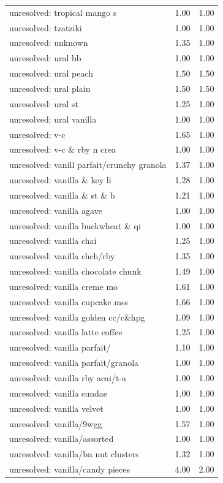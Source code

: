 \begin{table}
\begin{tabular}{lrr}
unresolved: tropical mango s & 1.00 & 1.00 \\
unresolved: tzatziki & 1.00 & 1.00 \\
unresolved: unknown & 1.35 & 1.00 \\
unresolved: ural bb & 1.00 & 1.00 \\
unresolved: ural peach & 1.50 & 1.50 \\
unresolved: ural plain & 1.50 & 1.50 \\
unresolved: ural st & 1.25 & 1.00 \\
unresolved: ural vanilla & 1.00 & 1.00 \\
unresolved: v-c & 1.65 & 1.00 \\
unresolved: v-c \& rby n crea & 1.00 & 1.00 \\
unresolved: vanill parfait/crunchy granola & 1.37 & 1.00 \\
unresolved: vanilla \& key li & 1.28 & 1.00 \\
unresolved: vanilla \& st \& b & 1.21 & 1.00 \\
unresolved: vanilla agave & 1.00 & 1.00 \\
unresolved: vanilla buckwheat \& qi & 1.00 & 1.00 \\
unresolved: vanilla chai & 1.25 & 1.00 \\
unresolved: vanilla chch/rby & 1.35 & 1.00 \\
unresolved: vanilla chocolate chunk & 1.49 & 1.00 \\
unresolved: vanilla creme mo & 1.61 & 1.00 \\
unresolved: vanilla cupcake mss & 1.66 & 1.00 \\
unresolved: vanilla golden cc/c\&hpg & 1.09 & 1.00 \\
unresolved: vanilla latte coffee & 1.25 & 1.00 \\
unresolved: vanilla parfait/ & 1.10 & 1.00 \\
unresolved: vanilla parfait/granola & 1.00 & 1.00 \\
unresolved: vanilla rby acai/t-a & 1.00 & 1.00 \\
unresolved: vanilla sundae & 1.00 & 1.00 \\
unresolved: vanilla velvet & 1.00 & 1.00 \\
unresolved: vanilla/9wgg & 1.57 & 1.00 \\
unresolved: vanilla/assorted & 1.00 & 1.00 \\
unresolved: vanilla/bn nut clusters & 1.32 & 1.00 \\
unresolved: vanilla/candy pieces & 4.00 & 2.00 \\

\end{tabular}
\end{table}
